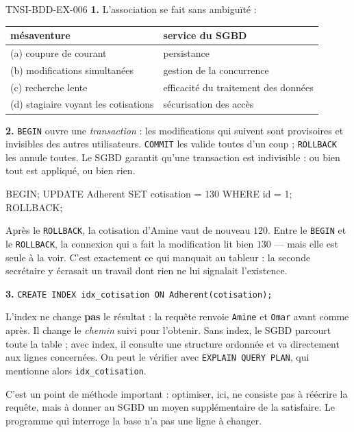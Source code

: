 \begin{corrige}{TNSI-BDD-EX-006}
\textbf{1.} L'association se fait sans ambiguïté :

\begin{center}
\begin{tabular}{ll}
\hline
mésaventure & service du SGBD \\
\hline
(a) coupure de courant & persistance \\
(b) modifications simultanées & gestion de la concurrence \\
(c) recherche lente & efficacité du traitement des données \\
(d) stagiaire voyant les cotisations & sécurisation des accès \\
\hline
\end{tabular}
\end{center}

\textbf{2.} \lstinline{BEGIN} ouvre une \emph{transaction} : les modifications
qui suivent sont provisoires et invisibles des autres utilisateurs.
\lstinline{COMMIT} les valide toutes d'un coup ; \lstinline{ROLLBACK} les annule
toutes. Le SGBD garantit qu'une transaction est indivisible : ou bien tout est
appliqué, ou bien rien.
\begin{sql}
BEGIN;
UPDATE Adherent SET cotisation = 130 WHERE id = 1;
ROLLBACK;
\end{sql}
Après le \lstinline{ROLLBACK}, la cotisation d'Amine vaut de nouveau $120$. Entre
le \lstinline{BEGIN} et le \lstinline{ROLLBACK}, la connexion qui a fait la
modification lit bien $130$ — mais elle est seule à la voir. C'est exactement ce
qui manquait au tableur : la seconde secrétaire y écrasait un travail dont rien
ne lui signalait l'existence.

\textbf{3.} \lstinline{CREATE INDEX idx_cotisation ON Adherent(cotisation);}

L'index ne change \textbf{pas} le résultat : la requête renvoie
\lstinline{Amine} et \lstinline{Omar} avant comme après. Il change le
\emph{chemin} suivi pour l'obtenir. Sans index, le SGBD parcourt toute la table ;
avec index, il consulte une structure ordonnée et va directement aux lignes
concernées. On peut le vérifier avec \lstinline{EXPLAIN QUERY PLAN}, qui
mentionne alors \lstinline{idx_cotisation}.

C'est un point de méthode important : optimiser, ici, ne consiste pas à réécrire
la requête, mais à donner au SGBD un moyen supplémentaire de la satisfaire. Le
programme qui interroge la base n'a pas une ligne à changer.


\end{corrige}
